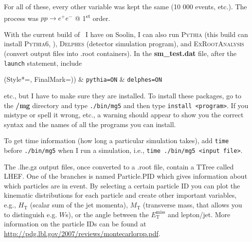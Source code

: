 For all of these, every other variable was kept the same (10 000 events, etc.). The process was $pp \rightarrow e^+ e^-$ @ 1\textsuperscript{st} order.

With the current build of \madgraph\ I have on Soolin, I can also run \textsc{Pythia} (this build can install \textsc{Pythia6}, \cite{Sjostrand:2007pythia}), \textsc{Delphes} \cite{Ovyn:2009delphes} (detector simulation program), and \textsc{ExRootAnalysis} (convert output files into .root containers). In the \textbf{sm\_test.dat} file, after the \verb!launch! statement, include

\begin{easylist}
\ListProperties(Style*=, FinalMark={)})
& \verb!pythia=ON!
& \verb!delphes=ON!
\end{easylist}

etc., but I have to make sure they are installed. To install these packages, go to the \textbf{/mg} directory and type \verb!./bin/mg5! and then type \verb!install <program>!. If you mistype or spell it wrong, etc., a warning should appear to show you the correct syntax and the names of all the programs you can install.

To get time information (how long a particular simulation takes), add \verb!time! before \verb!./bin/mg5! when I run a simulation, i.e., \verb!time ./bin/mg5 <input file>!.

The .lhe.gz output files, once converted to a .root file, contain a TTree called LHEF. One of the branches is named Particle.PID which gives information about which particles are in event. By selecting a certain particle ID you can plot the kinematic distributions for each particle and create other important variables, e.g., $H_{\mathrm{T}}$ (scalar sum of the jet momenta), $M_{\mathrm{T}}$ (transverse mass, that allows you to distinguish e.g. $W$s), or the angle between the $E_{\mathrm{T}}^{\mathrm{miss}}$ and lepton/jet. More information on the particle IDs can be found at \url{http://pdg.lbl.gov/2007/reviews/montecarlorpp.pdf}.

